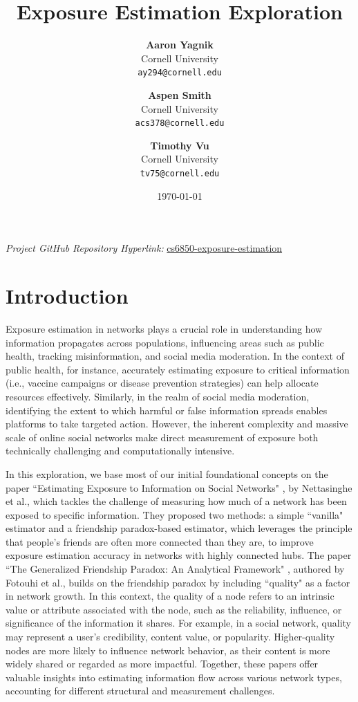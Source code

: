 \documentclass{article}
\title{Exposure Estimation Exploration}
\author{
    \textbf{Aaron Yagnik} \\
    Cornell University \\
    \texttt{ay294@cornell.edu}
    \and
    \textbf{Aspen Smith} \\
    Cornell University \\
    \texttt{acs378@cornell.edu}
    \and
    \textbf{Timothy Vu} \\
    Cornell University \\
    \texttt{tv75@cornell.edu}
}
\date{\today}
\begin{document}
\maketitle
\noindent \textit{Project GitHub Repository Hyperlink: }\href{https://github.com/asmith236/cs6850-exposure-estimation}{cs6850-exposure-estimation} 
\section*{Introduction} 

Exposure estimation in networks plays a crucial role in understanding how information propagates across populations, influencing areas such as public health, tracking misinformation, and social media moderation. In the context of public health, for instance, accurately estimating exposure to critical information (i.e., vaccine campaigns or disease prevention strategies) can help allocate resources effectively. Similarly, in the realm of social media moderation, identifying the extent to which harmful or false information spreads enables platforms to take targeted action. However, the inherent complexity and massive scale of online social networks make direct measurement of exposure both technically challenging and computationally intensive. 

In this exploration, we base most of our initial foundational concepts on the paper ``Estimating Exposure to Information on Social Networks" \cite{10.1145/3688599}, by Nettasinghe et al., which tackles the challenge of measuring how much of a network has been exposed to specific information. They proposed two methods: a simple ``vanilla" estimator and a friendship paradox-based estimator, which leverages the principle that people’s friends are often more connected than they are, to improve exposure estimation accuracy in networks with highly connected hubs. The paper ``The Generalized Friendship Paradox: An Analytical Framework" \cite{fotouhi2014generalizedfriendshipparadoxanalytical}, authored by Fotouhi et al., builds on the friendship paradox by including ``quality" as a factor in network growth. In this context, the quality of a node refers to an intrinsic value or attribute associated with the node, such as the reliability, influence, or significance of the information it shares. For example, in a social network, quality may represent a user's credibility, content value, or popularity. Higher-quality nodes are more likely to influence network behavior, as their content is more widely shared or regarded as more impactful. Together, these papers offer valuable insights into estimating information flow across various network types, accounting for different structural and measurement challenges.
\end{document}
